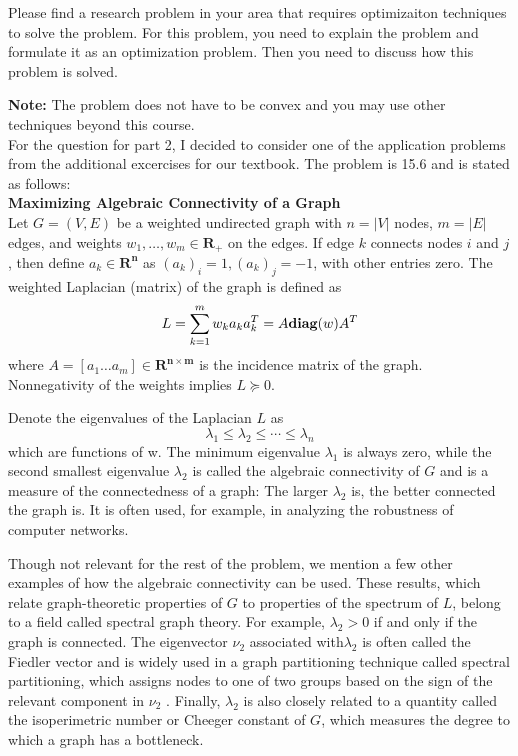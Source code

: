 \documentclass{article}
\begin{document}
Please find a research problem in your area that requires optimizaiton
techniques to solve the problem. For this problem, you need to explain
the problem and formulate it as an optimization problem. Then you need
to discuss how this problem is solved.

\textbf{Note:} The problem does not have to be convex and you may
use other techniques beyond this course.\\

For the question for part 2, I decided to consider one of the application problems
from the additional excercises for our textbook.  The problem is 15.6 and is stated
as follows:\\

\textbf{Maximizing Algebraic Connectivity of a Graph}\\

Let $G = (V, E)$ be a weighted undirected graph with $n = \vert V \vert$ nodes,
$m = \vert E \vert$ edges, and weights $w_{1}, \ldots, w_{m} \in \mathbf{R_{+}}$ on
the edges. If edge $k$ connects nodes $i$ and $j$, then define $a_{k} \in \mathbf{R^{n}}$
as $(a_{k})_{i} = 1, (a_{k})_{j} = -1$, with other entries zero.  The weighted Laplacian
(matrix) of the graph is defined as
\[
L = \sum_{k = 1}^{m} w_{k} a_{k} a_{k}^{T} = A \mbox{\textbf{diag}}(w)A^{T}
\]
where $A = [ a_{1} \ldots a_{m} ] \in \mathbf{R^{n \times m}}$ is the incidence matrix of the
graph. Nonnegativity of the weights implies $L \succeq 0$.

Denote the eigenvalues of the Laplacian $L$ as
\[
\lambda_{1} \leq \lambda_{2} \leq \cdots \leq \lambda_{n}
\]
which are functions of w. The minimum eigenvalue $\lambda_{1}$ is always zero, while the second smallest
eigenvalue $\lambda_{2}$ is called the algebraic connectivity of $G$ and is a measure of the connectedness of
a graph: The larger $\lambda_{2}$ is, the better connected the graph is. It is often used, for example, in
analyzing the robustness of computer networks.

Though not relevant for the rest of the problem, we mention a few other examples of how the
algebraic connectivity can be used. These results, which relate graph-theoretic properties of $G$
to properties of the spectrum of $L$, belong to a field called spectral graph theory. For example,
$\lambda_{2} > 0$ if and only if the graph is connected. The eigenvector $\nu_{2}$ associated with$\lambda_{2}$ is often called
the Fiedler vector and is widely used in a graph partitioning technique called spectral partitioning,
which assigns nodes to one of two groups based on the sign of the relevant component in $\nu_{2}$ . Finally,
$\lambda_{2}$ is also closely related to a quantity called the isoperimetric number or Cheeger constant of $G$,
which measures the degree to which a graph has a bottleneck.
\end{document}
